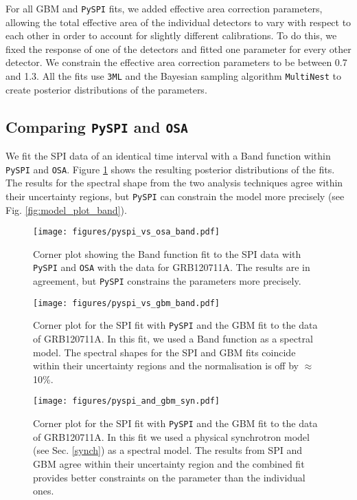 \documentclass{aa}
\begin{document}
For all GBM and {\tt PySPI} fits, we added effective area correction parameters, allowing the total effective area of the individual detectors to vary with respect to each other in order to account for slightly different calibrations. To do this, we fixed the response of one of the detectors and fitted one parameter for every other detector. We constrain the effective area correction parameters to be between 0.7 and 1.3.
All the fits use {\tt 3ML} \citep{3ML} and the Bayesian sampling algorithm {\tt MultiNest} \citep{multinest} to create posterior distributions of the parameters.

\subsection{Comparing {\tt PySPI} and {\tt OSA}}
\label{pyspi_osa}
We fit the SPI data of an identical time interval with a Band function within {\tt PySPI} and {\tt OSA}.
Figure \ref{fig:corner_osa_pyspi_band} shows the resulting posterior distributions of the fits. The results for the spectral shape from the two analysis techniques agree within their uncertainty regions, but {\tt PySPI} can constrain the model more precisely (see Fig. \ref{fig:model_plot_band}).

\begin{figure}
  \begin{centering}
    \texttt{[image: figures/pyspi\_vs\_osa\_band.pdf]}
    \caption{Corner plot showing the Band function fit to the SPI data with {\tt PySPI} and {\tt OSA} with the data for GRB120711A. The results are in agreement, but {\tt PySPI} constrains the parameters more precisely.}
    \label{fig:corner_osa_pyspi_band}
  \end{centering}
\end{figure}
\begin{figure}
  \begin{centering}
    \texttt{[image: figures/pyspi\_vs\_gbm\_band.pdf]}
    \caption{Corner plot for the SPI fit with {\tt PySPI} and the GBM fit to the data of GRB120711A. In this fit, we used a Band function as a spectral model. The spectral shapes for the SPI and GBM fits coincide within their uncertainty regions and the normalisation is off by $\approx$10\%.}
    \label{fig:corner_gbm_pyspi_band}
  \end{centering}
\end{figure}
\begin{figure}
  \begin{centering}
    \texttt{[image: figures/pyspi\_and\_gbm\_syn.pdf]}
    \caption{Corner plot for the SPI fit with {\tt PySPI} and the GBM fit to the data of GRB120711A. In this fit we used a physical synchrotron model (see Sec. \ref{synch}) as a spectral model. The results from SPI and GBM agree within their uncertainty region and the combined fit provides better constraints on the parameter than the individual ones.}
    \label{fig:corner_gbm_pyspi_joined_syn}
  \end{centering}
\end{figure}
\end{document}
